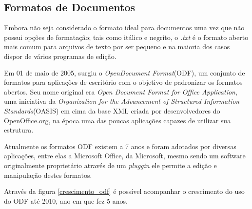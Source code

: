 \subsection{Formatos de Documentos}

Embora não seja considerado o formato ideal para documentos uma vez que não possui opções de formatação; tais como itálico e negrito, o \textit{.txt} é o formato aberto mais comum para arquivos de texto por ser pequeno e na maioria dos casos dispor de vários programas de edição.

Em 01 de maio de 2005, surgiu o \textit{OpenDocument Format}(ODF), um conjunto de formatos para aplicações de escritório com o objetivo de padronizar os formatos abertos. Seu nome original era \textit{Open Document Format for Office Application}, uma iniciativa da \textit{Organization for the Advancement of Structured Information Standards}(OASIS) em cima da base XML criada por desenvolvedores do OpenOffice.org, na época uma das poucas aplicações capazes de utilizar sua estrutura.

Atualmente os formatos ODF existem a 7 anos e foram adotados por diversas aplicações, entre elas a Microsoft Office, da Microsoft, mesmo sendo um software originalmente proprietário através de um \textit{pluggin} ele permite a edição e manipulação destes formatos.

Através da figura \ref{crescimento_odf} é possível acompanhar o crescimento do uso do ODF até 2010, ano em que fez 5 anos.

